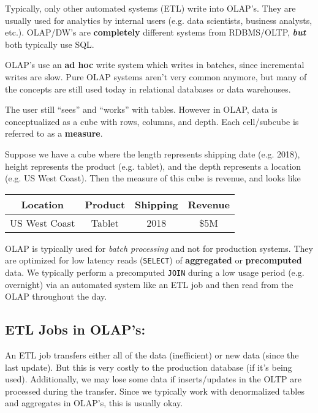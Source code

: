 \documentclass{report}
\newenvironment{example}{\begin{tcolorbox}[title={Example},colback=green!5!white,colframe=black!75!green]}{\end{tcolorbox}}
\renewcommand{\bf}[1]{\textbf{{#1}}}
\renewcommand{\tt}[1]{\texttt{{#1}}}
\renewcommand{\it}[1]{\textit{{#1}}}
\newcommand{\ib}[1]{\textit{\textbf{{#1}}}}
\begin{document}
Typically, only other automated systems (ETL) write into OLAP's. They are
usually used for analytics by internal users (e.g. data scientists, business
analysts, etc.). OLAP/DW's are \bf{completely} different systems from
RDBMS/OLTP, \ib{but} both typically use SQL.

OLAP's use an \bf{ad hoc} write system which writes in batches, since
incremental writes are slow. Pure OLAP systems aren't very common anymore, but
many of the concepts are still used today in relational databases or data
warehouses.

The user still ``sees'' and ``works'' with tables. However in OLAP, data is
conceptualized as a cube with rows, columns, and depth. Each cell/subcube is
referred to as a \bf{measure}.
\begin{example}
    Suppose we have a cube where the length represents shipping date (e.g.
    2018), height represents the product (e.g. tablet), and the depth represents
    a location (e.g. US West Coast). Then the measure of this cube is revenue,
    and looks like
    \vspace{0.5em}

    \centering
    \begin{tabular}{c|c|c|c}
        Location & Product & Shipping & Revenue \\
        \hline
        US West Coast & Tablet & 2018 & \$5M \\
    \end{tabular}
\end{example}

OLAP is typically used for \it{batch processing} and not for production systems.
They are optimized for low latency reads (\tt{SELECT}) of \bf{aggregated} or
\bf{precomputed} data. We typically perform a precomputed \tt{JOIN} during a low
usage period (e.g. overnight) via an automated system like an ETL job and then
read from the OLAP throughout the day.

\subsection{ETL Jobs in OLAP's:}
An ETL job transfers either all of the data (inefficient) or new data (since the
last update). But this is very costly to the production database (if it's being
used). Additionally, we may lose some data if inserts/updates in the OLTP are
processed during the transfer. Since we typically work with denormalized tables
and aggregates in OLAP's, this is usually okay.
\end{document}
